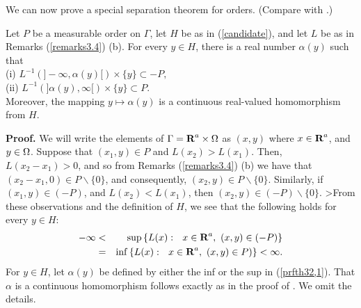 We can now prove a special separation theorem for orders. 
(Compare with \cite[Theorem 3.7]{hk}.) 
%
%
%
\begin{theorem32}
Let $P$ be a measurable
order on $\Gamma$, let 
$H$ be as in (\ref{candidate}), 
and let $L$ be as in Remarks (\ref{remarks3.4}) (b).  
For every $y\in H$, there is a real number 
$\alpha ( y )$ such that \\
(i)  $L^{-1}\left(]-\infty,\alpha(y)
[\right) \times \{y\}\subset -P,$\\
%
%
(ii)  $L^{-1}\left(]\alpha(y),\infty[\right) \times \{y\}\subset P.$\\
Moreover, the mapping $y\mapsto \alpha(y)$ is a continuous real-valued homomorphism from $H$.
\label{theorem32}
\end{theorem32}
%
{\bf Proof.}  We will write the elements of 
$\Gamma=\R^a\times \O$ as $(x,y)$ where $x \in \R^a$, 
and $y\in \Omega$.  
%
Suppose that $(x_1,y) \in P$ and $L(x_2)>L(x_1)$.  
%
Then, $L(x_2-x_1)>0$, and so from Remarks (\ref{remarks3.4}) (b)
we have that $(x_2-x_1,0)\in P\backslash \{0\}$, 
and consequently, $(x_2,y)\in P\backslash \{0\}$.  
%
Similarly, if $(x_1,y)\in (-P)$, and $L(x_2)<L(x_1)$, 
then $(x_2,y) \in (-P)\backslash \{0\}$.  
%
>From these observations and the definition of 
$H$, we see that the following holds  for every $y\in H$:
\begin{eqnarray}
-\infty		&<&	\sup\left\{ 
			L(x):\ \ x\in \R^a,\ (x,y)\in (-P)\right\}
			\nonumber\\
		&=&	\inf\left\{ 
			L(x):\ \ x\in \R^a,\ (x,y)\in P)\right\}<\infty.
\label{prfth32,1}
\end{eqnarray}
For $y\in H$, let $\alpha(y)$ be defined 
by either the inf or the sup in (\ref{prfth32,1}).  
That $\alpha$
 is a continuous homomorphism follows exactly as in the 
 proof of \cite[Theorem 3.7]{hk}.  We omit the details.
%
%
%
%

